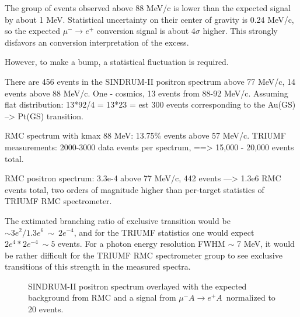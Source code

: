 \documentclass[12pt]{article}
\newcommand {\mumepconv} {\mbox{$\mu^- A \rightarrow e^+ A$}}
\begin{document}
The group of events observed above 88 MeV/c is lower than the expected signal by
about 1 MeV. Statistical uncertainty on their center of gravity is 0.24 MeV/c,
so the expected $\mu^- \rightarrow e^+$ conversion signal is about 4$\sigma$ higher.
This strongly disfavors an conversion interpretation of the excess.

However, to make a bump, a statistical fluctuation is required.

There are 456 events in the SINDRUM-II positron spectrum above 77 MeV/c,
14 events above 88 MeV/c. One - cosmics, 13 events from 88-92 MeV/c.
Assuming flat distribution: 13*92/4 = 13*23 = est 300 events corresponding to
the Au(GS) --> Pt(GS) transition.

RMC spectrum with kmax 88 MeV: 13.75\% events above 57 MeV/c.
TRIUMF measurements: 2000-3000 data events per spectrum, ==> 15,000 - 20,000
events total.

RMC positron spectrum: 3.3e-4 above 77 MeV/c, 442 events ---> 1.3e6 RMC events total,
two orders of magnitude higher than per-target statistics of TRIUMF RMC spectrometer.

The extimated branching ratio of exclusive transition would be 
$\sim 3e^2/1.3e^6 ~ \sim ~ 2e^{-4}$, and for the TRIUMF statistics one would expect
$2e^4*2e^{-4} ~\sim 5$ events. For a photon energy resolution FWHM $\sim$ 7 MeV,
it would be rather difficult for the TRIUMF RMC spectrometer group to see 
exclusive transitions of this strength in the measured spectra. 

\begin{figure}
\caption {
  \label{fig:ana_step2_sindrum_positron_best_fit_signal}
  SINDRUM-II positron spectrum overlayed with the expected background from RMC
  and a signal from \mumepconv\ normalized to 20 events.
}
\end{figure}
\end{document}
